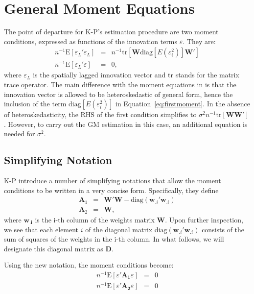 \documentclass{article}
\begin{document}
\section{General Moment Equations}
The point of departure for K-P's estimation procedure are two 
moment conditions, expressed as functions of the innovation terms
$\varepsilon$. They are:
\begin{eqnarray}
 n^{-1} \mbox{E} [\varepsilon_L'\varepsilon_L] &=& n^{-1} \mbox{tr} [ \mathbf{W} \mbox{diag}[E(\varepsilon_i^2)] \mathbf{W'} ] \label{eq:firstmoment}\\ 
 n^{-1} \mbox{E} [\varepsilon_L'\varepsilon] &=& 0,
\end{eqnarray}
where $\varepsilon_L$ is the spatially lagged innovation vector and tr stands for the
matrix trace operator. The main difference
with the moment equations in \cite{KelejianPrucha:99a} is that the innovation vector
is allowed to be heteroskedastic of general form, hence the inclusion of the 
term $\mbox{diag}[E(\varepsilon_i^2)]$ in Equation~\ref{eq:firstmoment}. In the absence of heteroskedasticity, the
RHS of the first condition simplifies to $\sigma^2 n^{-1} \mbox{tr} [\mathbf{WW'}]$. However, to carry out the
GM estimation in this case, an additional equation is needed for $\sigma^2$.

\subsection{Simplifying Notation}
K-P introduce a number of simplifying notations that allow the moment conditions to
be written in a very concise form. Specifically, they define
\begin{eqnarray}\label{eq:A1A2}
\mathbf{A}_1 &=& \mathbf{W'W} - \mbox{diag} (\mathbf{w}_{.i}'\mathbf{w}_{.i}) \label{eq:A1}\\
\mathbf{A}_2 &=& \mathbf{W}, \label{eq:A2}
\end{eqnarray}
where $\mathbf{w_{.i}}$ is the i-th column of the weights matrix $\mathbf{W}$. Upon
further inspection, we see that each element $i$ of the diagonal matrix 
$\mbox{diag} (\mathbf{w}_{.i}'\mathbf{w}_{.i})$ consists of the sum of squares of the
weights in the i-th column. In what follows, we will designate this diagonal matrix
as $\mathbf{D}$.

Using the new notation, the moment conditions become:
\begin{eqnarray*}
n^{-1} \mbox{E} [ \varepsilon ' \mathbf{A_1} \varepsilon ] &=& 0\\
n^{-1} \mbox{E} [ \varepsilon ' \mathbf{A_2} \varepsilon ] &=& 0
\end{eqnarray*}
\end{document}
